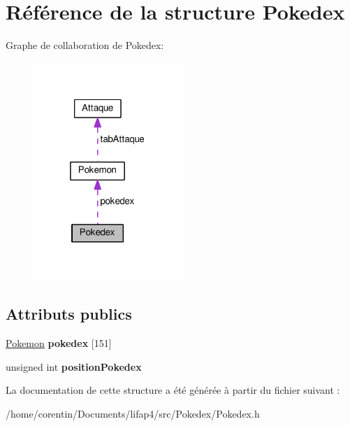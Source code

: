 \hypertarget{struct_pokedex}{}\section{Référence de la structure Pokedex}
\label{struct_pokedex}


Graphe de collaboration de Pokedex\+:\nopagebreak
\begin{figure}[H]
\begin{center}
\leavevmode
\includegraphics[width=160pt]{struct_pokedex__coll__graph}
\end{center}
\end{figure}
\subsection*{Attributs publics}
\begin{DoxyCompactItemize}
\item 
\mbox{\label{struct_pokedex_a830f41515021f320a1f667e11f539451}} 
\hyperlink{class_pokemon}{Pokemon} {\bfseries pokedex} \mbox{[}151\mbox{]}
\item 
\mbox{\label{struct_pokedex_aa1b524976debf20743a34e598b0ab00d}} 
unsigned int {\bfseries position\+Pokedex}
\end{DoxyCompactItemize}


La documentation de cette structure a été générée à partir du fichier suivant \+:\begin{DoxyCompactItemize}
\item 
/home/corentin/\+Documents/lifap4/src/\+Pokedex/Pokedex.\+h\end{DoxyCompactItemize}
